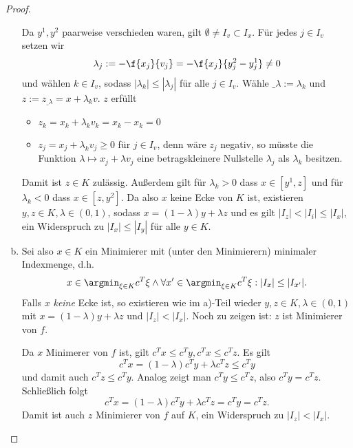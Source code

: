 \begin{lem}
\begin{proof}
\begin{enumerate}[(a)]
				Da $y^1, y^2$ paarweise verschieden waren, gilt $\emptyset \neq I_v \subset I_x$.
				Für jedes $j \in I_v$ setzen wir
				\[
					\lambda_j
					:= - \f {x_j}{v_j}
					= - \f {x_j}{y^2_j - y^1_j}
					\neq 0
				\]
				und wählen $k \in I_v$, sodass $|\lambda_k| \le |\lambda_j|$ für alle $j \in I_v$.
				Wähle $\_\lambda := \lambda_k$ und $z := z_{\_\lambda} = x + \lambda_k v$.
				$z$ erfüllt
				\begin{itemize}
					\item
						$z_k = x_k + \lambda_k v_k = x_k - x_k = 0$
					\item
						$z_j = x_j + \lambda_k v_j \ge 0$ für $j \in I_v$, denn wäre $z_j$ negativ, so müsste die Funktion $\lambda \mapsto x_j + \lambda v_j$ eine betragskleinere Nullstelle $\lambda_j$ als $\lambda_k$ besitzen.
				\end{itemize}
				Damit ist $z \in K$ zulässig.
				Außerdem gilt für $\lambda_k > 0$ dass $x \in [y^1, z]$ und für $\lambda_k < 0$ dass $x \in [z, y^2]$.
				Da also $x$ keine Ecke von $K$ ist, existieren $y, z \in K, \lambda \in (0,1)$, sodass $x = (1-\lambda) y + \lambda z$ und es gilt $|I_z| < |I_i| \le |I_x|$, ein Widerspruch zu $|I_x| \le |I_y|$ für alle $y \in K$.
			\item
				Sei also $x \in K$ ein Minimierer mit (unter den Minimierern) minimaler Indexmenge, d.h.
				\[
					x \in \argmin_{\xi \in K} c^T \xi
					\land \forall x' \in \argmin_{\xi \in K} c^T \xi : |I_x| \le |I_{x'}|.
				\]
				Falls $x$ \emph{keine} Ecke ist, so existieren wie im a)-Teil wieder $y, z \in K, \lambda \in (0, 1)$ mit $x = (1 - \lambda)y + \lambda z$ und $|I_z| < |I_x|$.
				Noch zu zeigen ist: $z$ ist Minimierer von $f$.

				Da $x$ Minimerer von $f$ ist, gilt $c^Tx \le c^Ty, c^Tx \le c^Tz$.
				Es gilt
				\[
					c^T x = (1-\lambda)c^T y + \lambda c^T z
					\le c^Ty
				\]
				und damit auch $c^T z \le c^T y$.
				Analog zeigt man $c^T y \le c^T z$, also $c^T y = c^T z$.
				Schließlich folgt
				\[
					c^T x = (1-\lambda)c^T y + \lambda c^Tz = c^T y = c^T z.
				\]
				Damit ist auch $z$ Minimierer von $f$ auf $K$, ein Widerspruch zu $|I_z| < |I_x|$.
		\end{enumerate}
	\end{proof}
\end{lem}

